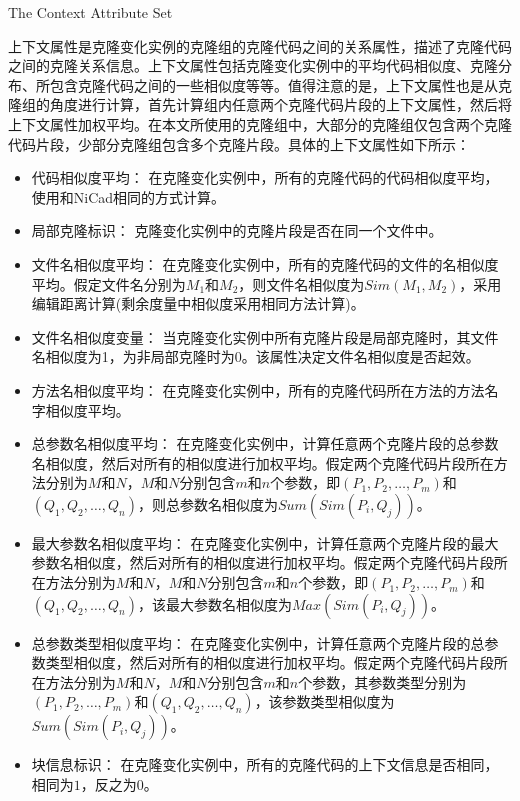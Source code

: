 {The Context Attribute Set}

上下文属性是克隆变化实例的克隆组的克隆代码之间的关系属性，描述了克隆代码之间的克隆关系信息。上下文属性包括克隆变化实例中的平均代码相似度、克隆分布、所包含克隆代码之间的一些相似度等等。值得注意的是，上下文属性也是从克隆组的角度进行计算，首先计算组内任意两个克隆代码片段的上下文属性，然后将上下文属性加权平均。在本文所使用的克隆组中，大部分的克隆组仅包含两个克隆代码片段，少部分克隆组包含多个克隆片段。具体的上下文属性如下所示：

\begin{itemize}
\item
代码相似度平均：
在克隆变化实例中，所有的克隆代码的代码相似度平均，使用和NiCad相同的方式计算\cite{roy2008nicad}。
\item
局部克隆标识：
克隆变化实例中的克隆片段是否在同一个文件中。
\item
文件名相似度平均：
在克隆变化实例中，所有的克隆代码的文件的名相似度平均。假定文件名分别为$M_1$和$M_2$，则文件名相似度为$Sim(M_1,M_2)$，采用编辑距离\cite{levenshtein1966binary}计算(剩余度量中相似度采用相同方法计算)。
\item
文件名相似度变量：
当克隆变化实例中所有克隆片段是局部克隆时，其文件名相似度为1，为非局部克隆时为0。该属性决定文件名相似度是否起效。
\item
方法名相似度平均：
在克隆变化实例中，所有的克隆代码所在方法的方法名字相似度平均。
\item
总参数名相似度平均：
在克隆变化实例中，计算任意两个克隆片段的总参数名相似度，然后对所有的相似度进行加权平均。假定两个克隆代码片段所在方法分别为$M$和$N$，$M$和$N$分别包含$m$和$n$个参数，即$(P_1,P_2,…,P_m)$和$(Q_1,Q_2,…,Q_n)$，则总参数名相似度为$Sum(Sim(P_i,Q_j))$。
\item
最大参数名相似度平均：
在克隆变化实例中，计算任意两个克隆片段的最大参数名相似度，然后对所有的相似度进行加权平均。假定两个克隆代码片段所在方法分别为$M$和$N$，$M$和$N$分别包含$m$和$n$个参数，即$(P_1,P_2,…,P_m)$和$(Q_1,Q_2,…,Q_n)$，该最大参数名相似度为$Max(Sim(P_i,Q_j))$。
\item 
总参数类型相似度平均：
在克隆变化实例中，计算任意两个克隆片段的总参数类型相似度，然后对所有的相似度进行加权平均。假定两个克隆代码片段所在方法分别为$M$和$N$，$M$和$N$分别包含$m$和$n$个参数，其参数类型分别为$(P_1,P_2,…,P_m)$和$(Q_1,Q_2,…,Q_n)$，该参数类型相似度为$Sum(Sim(P_i,Q_j))$。
\item
块信息标识：
在克隆变化实例中，所有的克隆代码的上下文信息是否相同，相同为$1$，反之为$0$。
\end{itemize}

